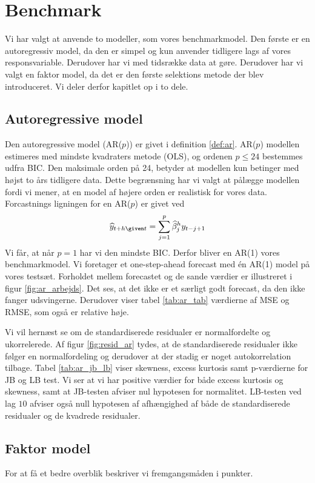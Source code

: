 \chapter{Benchmark}
Vi har valgt at anvende to modeller, som vores benchmarkmodel. Den første er en autoregressiv model, da den er simpel og kun anvender tidligere lags af vores responsvariable. Derudover har vi med tidsrække data at gøre. 
Derudover har vi valgt en faktor model, da det er den første selektions metode der blev introduceret. 
Vi deler derfor kapitlet op i to dele. 

\section{Autoregressive model}
Den autoregressive model (AR($p$)) er givet i definition \ref{def:ar}. 
AR($p$) modellen estimeres med mindste kvadraters metode (OLS), og ordenen $p \leq 24$ bestemmes udfra BIC. Den maksimale orden på 24, betyder at modellen kun betinger med højst to års tidligere data. Dette begrænsning har vi valgt at pålægge modellen fordi vi mener, at en model af højere orden er realistisk for vores data. 
Forcastnings ligningen for en AR($p$) er givet ved 
\begin{equation}
\widehat{y}_{t+h \given t} = \sum_{j = 1}^p \widehat{\beta}_j^h y_{t-j+1}
\end{equation}
Vi får, at når $p = 1$ har vi den mindste BIC. 
Derfor bliver en AR(1) vores benchmarkmodel. 
Vi foretager et one-step-ahead forecast med én AR(1) model på vores testsæt.
Forholdet mellem forecastet og de sande værdier er illustreret i figur \ref{fig:ar_arbejds}. 
Det ses, at det ikke er et særligt godt forecast, da den ikke fanger udsvingerne. 
Derudover viser tabel \ref{tab:ar_tab} værdierne af MSE og RMSE, som også er relative høje. 



 
Vi vil hernæst se om de standardiserede residualer er normalfordelte og ukorrelerede.
Af figur \ref{fig:resid_ar} tydes, at de standardiserede residualer ikke følger en normalfordeling og derudover at der stadig er noget autokorrelation tilbage. 
Tabel \ref{tab:ar_jb_lb} viser skewness, excess kurtosis samt p-værdierne for JB og LB test. 
Vi ser at vi har positive værdier for både excess kurtosis og skewness, samt at JB-testen afviser nul hypotesen for normalitet. 
LB-testen ved lag $10$ afviser også null hypotesen af afhængighed af både de standardiserede residualer og de kvadrede residualer. 



 
\section{Faktor model}
For at få et bedre overblik beskriver vi fremgangsmåden i punkter. 

